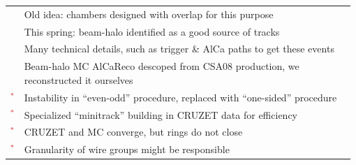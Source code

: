 \documentclass[compress]{beamer}
\begin{document}
\begin{frame}
\vspace{0.1 cm}
\renewcommand{\arraystretch}{1.2}
\begin{tabular}{l p{0.98\linewidth}}
& Old idea: chambers designed with overlap for this purpose \\
& This spring: beam-halo identified as a good source of tracks \\
& Many technical details, such as trigger \& AlCa paths to get these events \\
& Beam-halo MC AlCaReco descoped from CSA08 production, we reconstructed it ourselves \\
\textcolor{red}{$^*$} & Instability in ``even-odd'' procedure, replaced with ``one-sided'' procedure \\
\textcolor{red}{$^*$} & Specialized ``minitrack'' building in CRUZET data for efficiency \\
\textcolor{red}{$^*$} & CRUZET and MC converge, but rings do not close \\
\textcolor{red}{$^*$} & Granularity of wire groups might be responsible
\end{tabular}
\end{frame}
\end{document}
